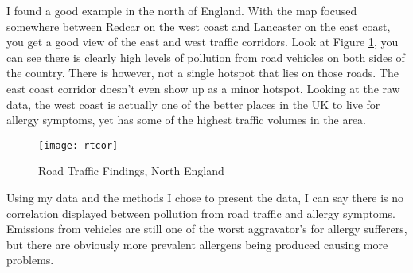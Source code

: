 I found a good example in the north of England. With the map focused somewhere between Redcar on the west coast and Lancaster on the east coast, you get a good view of the east and west traffic corridors. Look at Figure \ref{fig:rtcor}, you can see there is clearly high levels of pollution from road vehicles on both sides of the country. There is however, not a single hotspot that lies on those roads. The east coast corridor doesn't even show up as a minor hotspot. Looking at the raw data, the west coast is actually one of the better places in the UK to live for allergy symptoms, yet has some of the highest traffic volumes in the area.\\

\begin{figure}[H]
\begin{center}
\texttt{[image: rtcor]}
\label{fig:rtcor}
\caption{Road Traffic Findings, North England}
\end{center}
\end{figure}

Using my data and the methods I chose to present the data, I can say there is no correlation displayed between pollution from road traffic and allergy symptoms. Emissions from vehicles are still one of the worst aggravator's for allergy sufferers, but there are obviously more prevalent allergens being produced causing more problems. 